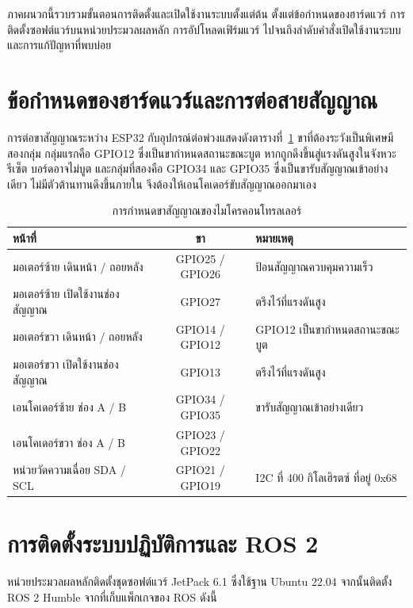 \documentclass[a4paper,12pt]{report}
\begin{document}
ภาคผนวกนี้รวบรวมขั้นตอนการติดตั้งและเปิดใช้งานระบบตั้งแต่ต้น
ตั้งแต่ข้อกำหนดของฮาร์ดแวร์ การติดตั้งซอฟต์แวร์บนหน่วยประมวลผลหลัก
การอัปโหลดเฟิร์มแวร์ ไปจนถึงลำดับคำสั่งเปิดใช้งานระบบและการแก้ปัญหาที่พบบ่อย

\section{ข้อกำหนดของฮาร์ดแวร์และการต่อสายสัญญาณ}

การต่อขาสัญญาณระหว่าง ESP32 กับอุปกรณ์ต่อพ่วงแสดงดังตารางที่~\ref{tab:pinout}
ขาที่ต้องระวังเป็นพิเศษมีสองกลุ่ม กลุ่มแรกคือ GPIO12
ซึ่งเป็นขากำหนดสถานะขณะบูต หากถูกดึงขึ้นสู่แรงดันสูงในจังหวะรีเซ็ต บอร์ดอาจไม่บูต
และกลุ่มที่สองคือ GPIO34 และ GPIO35 ซึ่งเป็นขารับสัญญาณเข้าอย่างเดียว
ไม่มีตัวต้านทานดึงขึ้นภายใน จึงต้องให้เอนโคเดอร์ขับสัญญาณออกมาเอง

\begin{table}[H]
\centering
\caption[การกำหนดขาสัญญาณของไมโครคอนโทรลเลอร์ (ภาคผนวก ก)]{การกำหนดขาสัญญาณของไมโครคอนโทรลเลอร์}
\label{tab:pinout}
\small
\begin{tabularx}{\textwidth}{|X|c|X|}
\hline
\textbf{หน้าที่} & \textbf{ขา} & \textbf{หมายเหตุ} \\
\hline
มอเตอร์ซ้าย เดินหน้า / ถอยหลัง & GPIO25 / GPIO26 & ป้อนสัญญาณควบคุมความเร็ว \\
\hline
มอเตอร์ซ้าย เปิดใช้งานช่องสัญญาณ & GPIO27 & ตรึงไว้ที่แรงดันสูง \\
\hline
มอเตอร์ขวา เดินหน้า / ถอยหลัง & GPIO14 / GPIO12 & GPIO12 เป็นขากำหนดสถานะขณะบูต \\
\hline
มอเตอร์ขวา เปิดใช้งานช่องสัญญาณ & GPIO13 & ตรึงไว้ที่แรงดันสูง \\
\hline
เอนโคเดอร์ซ้าย ช่อง A / B & GPIO34 / GPIO35 & ขารับสัญญาณเข้าอย่างเดียว \\
\hline
เอนโคเดอร์ขวา ช่อง A / B & GPIO23 / GPIO22 & \\
\hline
หน่วยวัดความเฉื่อย SDA / SCL & GPIO21 / GPIO19 & I2C ที่ 400 กิโลเฮิรตซ์ ที่อยู่ 0x68 \\
\hline
\end{tabularx}
\end{table}

\section{การติดตั้งระบบปฏิบัติการและ ROS 2}

หน่วยประมวลผลหลักติดตั้งชุดซอฟต์แวร์ JetPack 6.1 ซึ่งใช้ฐาน Ubuntu 22.04
จากนั้นติดตั้ง ROS 2 Humble จากที่เก็บแพ็กเกจของ ROS ดังนี้
\end{document}
